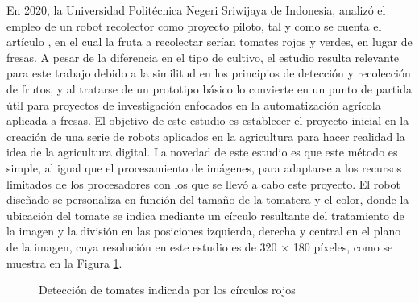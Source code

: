 En 2020, la Universidad Politécnica Negeri Sriwijaya de Indonesia, analizó el empleo de un robot recolector como proyecto piloto, tal y como se cuenta el artículo \cite{Oktarina20}, en el cual la fruta a recolectar serían tomates rojos y verdes, en lugar de fresas. A pesar de la diferencia en el tipo de cultivo, el estudio resulta relevante para este trabajo debido a la similitud en los principios de detección y recolección de frutos, y al tratarse de un prototipo básico lo convierte en un punto de partida útil para proyectos de investigación enfocados en la automatización agrícola aplicada a fresas. El objetivo de este estudio es establecer el proyecto inicial en la creación de una serie de robots aplicados en la agricultura para hacer realidad la idea de la agricultura digital. La novedad de este estudio es que este método es simple, al igual que el procesamiento de imágenes, para adaptarse a los recursos limitados de los procesadores con los que se llevó a cabo este proyecto. El robot diseñado se personaliza en función del tamaño de la tomatera y el color, donde la ubicación del tomate se indica mediante un círculo resultante del tratamiento de la imagen y la división en las posiciones izquierda, derecha y central en el plano de la imagen, cuya resolución en este estudio es de 320 × 180 píxeles, como se muestra en la Figura \ref{fig:Deteccion_tomates}. 

\begin{figure}[H]
    \begin{center}
      \subcapcentertrue
      \hspace{2mm}
    \end{center}
    \caption{Detección de tomates indicada por los círculos rojos}
    \label{fig:Deteccion_tomates}
  \end{figure}

